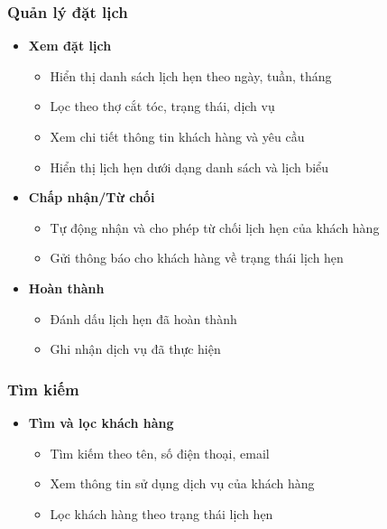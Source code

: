 \subsubsection{Quản lý đặt lịch}
\begin{itemize}
    \item \textbf{Xem đặt lịch}
    \begin{itemize}
        \item Hiển thị danh sách lịch hẹn theo ngày, tuần, tháng
        \item Lọc theo thợ cắt tóc, trạng thái, dịch vụ
        \item Xem chi tiết thông tin khách hàng và yêu cầu
        \item Hiển thị lịch hẹn dưới dạng danh sách và lịch biểu
    \end{itemize}
    
    \item \textbf{Chấp nhận/Từ chối}
    \begin{itemize}
        \item Tự động nhận và cho phép từ chối lịch hẹn của khách hàng
        \item Gửi thông báo cho khách hàng về trạng thái lịch hẹn
    \end{itemize}
    
    \item \textbf{Hoàn thành}
    \begin{itemize}
        \item Đánh dấu lịch hẹn đã hoàn thành
        \item Ghi nhận dịch vụ đã thực hiện
    \end{itemize}
    
\end{itemize}

\subsubsection{Tìm kiếm}
\begin{itemize}
    \item \textbf{Tìm và lọc khách hàng}
    \begin{itemize}
        \item Tìm kiếm theo tên, số điện thoại, email
        \item Xem thông tin sử dụng dịch vụ của khách hàng
        \item Lọc khách hàng theo trạng thái lịch hẹn
    \end{itemize}
\end{itemize}

